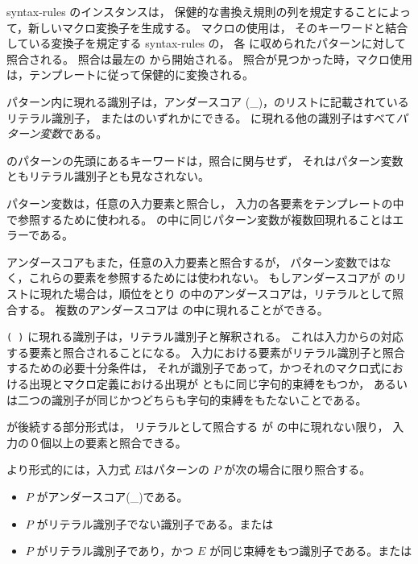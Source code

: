 \begin{entry}
\semantics 
{\cf syntax-rules} のインスタンスは，
保健的な書換え規則の列を規定することによって，新しいマクロ変換子を生成する。
マクロの使用は，
そのキーワードと結合している変換子を規定する {\cf syntax-rules} の，
各  に収められたパターンに対して照合される。
照合は最左の  から開始される。
照合が見つかった時，マクロ使用は，テンプレートに従って保健的に変換される。

パターン内に現れる識別子は，アンダースコア
({\cf \_})，のリストに記載されているリテラル識別子，
またはのいずれかにできる。
 に現れる他の識別子はすべて{\em パターン変数}である。

 のパターンの先頭にあるキーワードは，照合に関与せず，
それはパターン変数ともリテラル識別子とも見なされない。

パターン変数は，任意の入力要素と照合し，
入力の各要素をテンプレートの中で参照するために使われる。
 の中に同じパターン変数が複数回現れることはエラーである。

アンダースコアもまた，任意の入力要素と照合するが，
パターン変数ではなく，これらの要素を参照するためには使われない。
もしアンダースコアが  のリストに現れた場合は，順位をとり
 の中のアンダースコアは，リテラルとして照合する。
複数のアンダースコアは  の中に現れることができる。

\texttt{( \dotsfoo)} に現れる識別子は，リテラル識別子と解釈される。
これは入力からの対応する要素と照合されることになる。
入力における要素がリテラル識別子と照合するための必要十分条件は，
それが識別子であって，かつそれのマクロ式における出現とマクロ定義における出現が
ともに同じ字句的束縛をもつか，
あるいは二つの識別子が同じかつどちらも字句的束縛をもたないことである。

 が後続する部分形式は，
リテラルとして照合する  が  の中に現れない限り，
入力の０個以上の要素と照合できる。

より形式的には，入力式 $E$はパターンの $P$ が次の場合に限り照合する。

\begin{itemize}
\item $P$ がアンダースコア({\cf \_})である。

\item $P$ がリテラル識別子でない識別子である。または

\item $P$ がリテラル識別子であり，かつ $E$ が同じ束縛をもつ識別子である。または


\end{itemize}
\end{entry}
